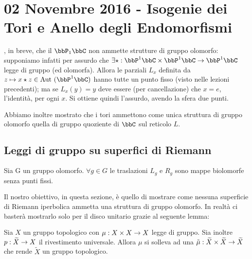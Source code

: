 \chapter{02 Novembre 2016 - Isogenie dei Tori e Anello degli Endomorfismi}
\justify

, in breve, che il $\bbP_{1}\bbC $ non ammette strutture di gruppo olomorfo: supponiamo infatti per assurdo che $\exists \star: \bbP^1\bbC \times \bbP^1\bbC \rar \bbP^1\bbC$ legge di gruppo (ed olomorfa). Allora le parziali $L_x$ definita da $z \mapsto x \star z \in \Aut(\bbP^1\bbC)$ hanno tutte un punto fisso (visto nelle lezioni precedenti); ma se $L_x(y) = y$ deve essere (per cancellazione) che $x = e$, l'identità, per ogni $x$. Si ottiene quindi l'assurdo, avendo la sfera due punti.

Abbiamo inoltre mostrato che i tori ammettono come unica struttura di gruppo olomorfo quella di gruppo quoziente di $\bbC$ sul reticolo $L$.

\section{Leggi di gruppo su superfici di Riemann}
\begin{osservazione}
Sia G un gruppo olomorfo. $\forall g \in G$ le traslazioni $L_{g}$ e $R_{g}$ sono mappe biolomorfe senza punti fissi. 
\end{osservazione}

\noindent Il nostro obiettivo, in questa sezione, è quello di mostrare come nessuna superficie di Riemann iperbolica ammetta una struttura di gruppo olomorfo. In realtà ci basterà mostrarlo solo per il disco unitario grazie al seguente lemma:
\begin{lemma}
Sia $X$ un gruppo topologico con $\mu : X\times X \rightarrow X$ legge di gruppo. Sia inoltre $p :\widetilde{X} \rightarrow X$ il rivestimento universale.
Allora $\mu$ si solleva ad una $\tilde{\mu} : \widetilde{X} \times \widetilde{X} \rightarrow \widetilde{X}$ che rende $\widetilde{X}$ un gruppo topologico.
\end{lemma}

